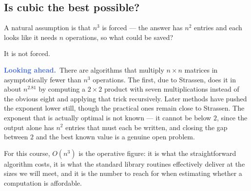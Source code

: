 \documentclass[11pt]{article}
\theoremstyle{plain}
\theoremstyle{definition}
\theoremstyle{remark}
\newcommand{\lookahead}{\par\smallskip\noindent
  \textbf{\sffamily\textcolor{RoyalBlue}{Looking ahead.}}\ \ignorespaces}
\begin{document}
\subsection{Is cubic the best possible?}
A natural assumption is that $n^{3}$ is forced --- the answer has $n^{2}$
entries and each looks like it needs $n$ operations, so what could be saved?

It is not forced.

\lookahead There are algorithms that multiply $n\times n$ matrices in
asymptotically fewer than $n^{3}$ operations. The first, due to Strassen, does
it in about $n^{2.81}$ by computing a $2\times2$ product with seven
multiplications instead of the obvious eight and applying that trick
recursively. Later methods have pushed the exponent lower still, though the
practical ones remain close to Strassen. The exponent that is actually optimal
is not known --- it cannot be below $2$, since the output alone has $n^{2}$
entries that must each be written, and closing the gap between $2$ and the best
known value is a genuine open problem.

For this course, $O(n^{3})$ is the operative figure: it is what the
straightforward algorithm costs, it is what the standard library routines
effectively deliver at the sizes we will meet, and it is the number to reach for
when estimating whether a computation is affordable.
\end{document}
